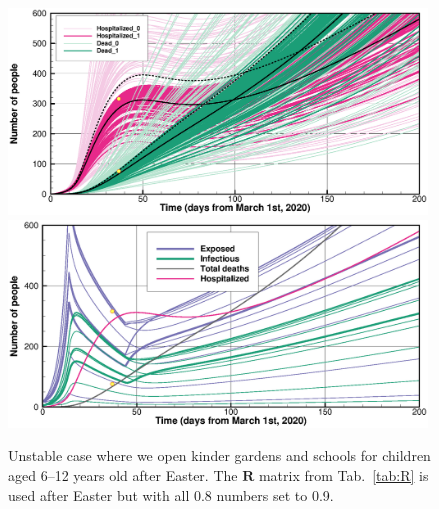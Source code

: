 \documentclass[twoside,11pt]{article}
\newcommand{\bmR}{{\mathbf{R}}}
\begin{document}
\begin{figure}[p]
\begin{center}
\includegraphics[width=0.99\textwidth]{openA09.eps} \\
\includegraphics[width=0.99\textwidth]{openB09.eps} 
\end{center}
\caption{Unstable case where we open kinder gardens and schools for children aged 6--12 years old after Easter. 
The $\bmR$ matrix from Tab.~\ref{tab:R} is used after Easter but with all 0.8 numbers set to 0.9.
\label{fig:open09}}
\end{figure}



\newpage
\end{document}
